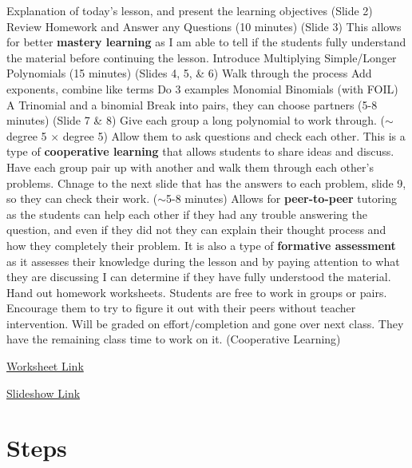 \begin{outline}
    \1 Explanation of today's lesson, and present the learning objectives (Slide 2)
    \1 Review Homework and Answer any Questions (10 minutes) (Slide 3)
        \2 This allows for better \textbf{mastery learning} as I am able to tell if the students fully understand the material before continuing the lesson.
    \1 Introduce Multiplying Simple/Longer Polynomials (15 minutes) (Slides 4, 5, \& 6)
        \2 Walk through the process
        \2 Add exponents, combine like terms
        \2 Do 3 examples
            \3 Monomial
            \3 Binomials (with FOIL)
            \3 A Trinomial and a binomial
    \1 Break into pairs, they can choose partners (5-8 minutes) (Slide 7 \& 8)
        \2 Give each group a long polynomial to work through. ($\sim$degree 5 $\times$ degree 5)
        \2 Allow them to ask questions and check each other.
            \3 This is a type of \textbf{cooperative learning} that allows students to share ideas and discuss.
    \1 Have each group pair up with another and walk them through each other's problems. Chnage to the next slide that has the answers to each problem, slide 9, so they can check their work. ($\sim$5-8 minutes)
        \2 Allows for \textbf{peer-to-peer} tutoring as the students can help each other if they had any trouble answering the question, and even if they did not they can explain their thought process and how they completely their problem. It is also a type of \textbf{formative assessment} as it assesses their knowledge during the lesson and by paying attention to what they are discussing I can determine if they have fully understood the material.
    \1 Hand out homework worksheets. Students are free to work in groups or pairs. Encourage them to try to figure it out with their peers without teacher intervention. Will be graded on effort/completion and gone over next class. They have the remaining class time to work on it. (Cooperative Learning)
\end{outline}

\href{https://edia.app/worksheets/algebra_2/alg2_polynomials/multiplying_polynomials}{Worksheet Link}

\href{https://www.canva.com/design/DAF0BNXNsS0/tsfpypAb2t-n2v5nL9Hqkw/edit?utm_content=DAF0BNXNsS0&utm_campaign=designshare&utm_medium=link2&utm_source=sharebutton}{Slideshow Link}

\section{Steps}

